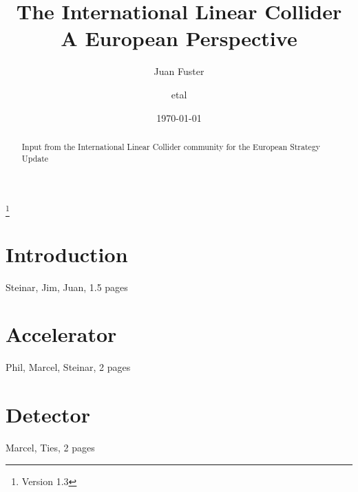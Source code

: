 \documentclass[%
 reprint,
 amsmath,amssymb,
 aps,
]{revtex4-1}
\begin{document}

\title{The International Linear Collider\\ A European Perspective}%
\thanks{Version 1.3}%

\author{Juan Fuster}
\author{etal}%
%


\date{\today}%

\begin{abstract}
Input from the International Linear Collider community for the European Strategy Update

\end{abstract}

\maketitle


\section{\label{sec:intro}Introduction}

Steinar, Jim, Juan, 1.5 pages

\section{\label{sec:acc}Accelerator}

Phil, Marcel, Steinar, 2 pages

\section{\label{sec:det}Detector}
Marcel, Ties, 2 pages
\end{document}
